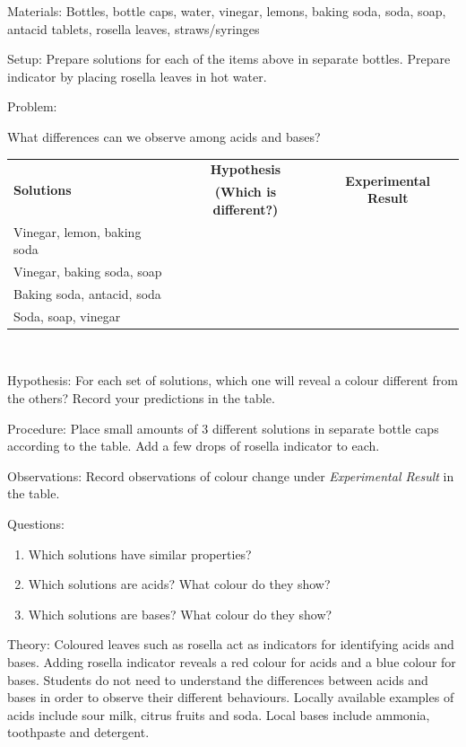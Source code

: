 \begin{description*}
\item[Materials:]{Bottles, bottle caps, water, vinegar, lemons, baking soda, soda, soap, antacid tablets, rosella leaves, straws/syringes}
\item[Setup:]{Prepare solutions for each of the items above in separate bottles. Prepare indicator by placing rosella leaves in hot water.}\\
\item[Problem:]{What differences can we observe among acids and bases?\\

\begin{tabular}{|l|c|c|} \hline
\multirow{2}{*}{\textbf{Solutions}} & \textbf{Hypothesis} & \multirow{2}{*}{\textbf{Experimental Result}} \\
& \textbf{(Which is different?)} & \\ \hline
Vinegar, lemon, baking soda & & \\ \hline
Vinegar, baking soda, soap & & \\ \hline
Baking soda, antacid, soda & & \\ \hline
Soda, soap, vinegar & & \\ \hline
\end{tabular} \\[10pt]
}
\item[Hypothesis:]{For each set of solutions, which one will reveal a colour different from the others? Record your predictions in the table.}
\item[Procedure:]{Place small amounts of 3 different solutions in separate bottle caps according to the table. Add a few drops of rosella indicator to each.}
\item[Observations:]{Record observations of colour change under \emph{Experimental Result} in the table.}
\item[Questions:]{\hfill
\begin{enumerate}
\item Which solutions have similar properties?
\item Which solutions are acids? What colour do they show?
\item Which solutions are bases? What colour do they show?
\end{enumerate}
}
\item[Theory:]{Coloured leaves such as rosella act as indicators for identifying acids and bases. Adding rosella indicator reveals a red colour for acids and a blue colour for bases. Students do not need to understand the differences between acids and bases in order to observe their different behaviours. Locally available examples of acids include sour milk, citrus fruits and soda. Local bases include ammonia, toothpaste and detergent.}
\end{description*}


